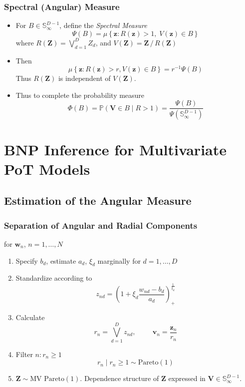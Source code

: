 \documentclass[aspectratio=169,10pt]{beamer}
\begin{document}
\begin{frame}
    \frametitle{Spectral (Angular) Measure}
    \begin{itemize}
    \item For $B \in \mathbb{S}_{\infty}^{D-1}$, define the \emph{Spectral Measure}
    \[
        \Psi(B) = \mu\left\lbrace \bm{z} : R(\bm{z}) > 1,\;V(\bm{z}) \in B\right\rbrace
    \]
    where $R(\bm{Z}) = \bigvee_{d = 1}^D Z_d$,  and $V(\bm{Z}) = \bm{Z}\,/\,R(\bm{Z})$
    \item Then
    \[
        \mu\left\lbrace\bm{z} : R(\bm{z}) > r, V(\bm{z}) \in B\right\rbrace = r^{-1}\Psi(B)    
    \]
    Thus $R(\bm{Z})$ is independent of $V(\bm{Z})$.
    \item Thus to complete the probability measure
    \[
        \Phi(B) = \mathbb{P}\left(\bm{V} \in B \mid R > 1\right) = 
            \frac{\Psi(B)}{\Psi\left(\mathbb{S}_{\infty}^{D-1}\right)}
    \]
    \end{itemize}
\end{frame} %

\section[Multivariate PoT]{BNP Inference for Multivariate PoT Models}
\subsection{Estimation of the Angular Measure}
\begin{frame}
    \frametitle{Separation of Angular and Radial Components}
    {\small
    for $\bm{w}_n$, $n = 1,\ldots,N$
    \begin{enumerate}
        \item Specify $b_d$, estimate $a_d$, $\xi_d$    
            marginally for $d = 1,\ldots,D$
        \item Standardize according to
        \[
            z_{nd} = 
                \left(1 + \xi_d\frac{w_{nd} - b_d}{a_d}\right)_+^{\frac{1}{\xi_d}}        
        \]
        \item Calculate
        \[
            r_n = \bigvee_{d = 1}^D z_{nd},\hspace{1cm}\bm{v}_n = 
                \frac{\bm{z}_n}{r_n}
        \]
        \item Filter $n : r_n \geq 1$
        \[
            r_n \mid r_n \geq 1 \sim \text{Pareto}(1)
        \]
        \item $\bm{Z} \sim \text{MV Pareto}(1)$.  Dependence structure of 
            $\bm{Z}$ expressed in $\bm{V} \in \mathbb{S}_{\infty}^{D-1}$.
    \end{enumerate}
    }
\end{frame} %
\end{document}
